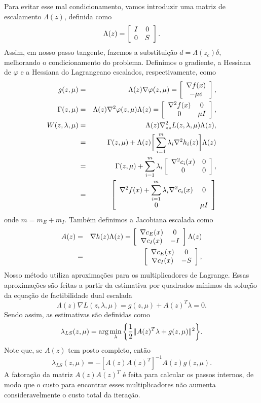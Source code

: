 Para evitar esse mal condicionamento, vamos
introduzir uma matriz de escalamento $\Lambda(z)$, definida como
$$\Lambda(z) = \left[\begin{array}{cc}I & 0 \\ 0 & S\end{array}\right].$$
Assim, em nosso passo tangente, fazemos a substituição $d=\Lambda(z_c)\delta$,
melhorando o condicionamento do problema.
Definimos o gradiente, a Hessiana de $\varphi$ e a 
Hessiana do Lagrangeano escalados, respectivamente, como
\begin{eqnarray}
g(z,\mu) & = & \Lambda(z) \nabla\varphi(z,\mu) = \vetor{\nabla f(x)}{-\mu e},
  \visiblelbl{def:gradiente_escalado} \\ 
\Gamma(z,\mu) & = & \Lambda(z) \nabla^2\varphi(z,\mu)\Lambda(z) = 
  \matriz{\nabla^2 f(x)}{0}{0}{\mu I}, \visiblelbl{def:hess_escalada}\\
W(z,\lambda,\mu) & = & \Lambda(z)\nabla_{zz}^2
  L(z,\lambda,\mu)\Lambda(z),\visiblelbl{def:hess_lagr_escalada} \\
& = & \Gamma(z,\mu) + \Lambda(z)\bigg[\sum_{i = 1}^m \lambda_i \nabla^2
 h_i(z)\bigg]\Lambda(z)\nonumber \\
& = & \Gamma(z,\mu) + \sum_{i = 1}^m\lambda_i\matriz{\nabla^2 c_i(x)}{0}{0}{0},
 \nonumber \\
 & = & \matriz{\nabla^2f(x)+\displaystyle\sum_{i=1}^m\lambda_i\nabla^2
   c_i(x)}{0}{0}{\mu I} \nonumber
\end{eqnarray}
onde $m = m_E+m_I$.
Também definimos a Jacobiana escalada como
\begin{eqnarray}
A(z) & = & \nabla h(z) \Lambda(z) = 
\matriz{\nabla  c_E(x)}{0}{\nabla c_I(x)}{-I}\Lambda(z) \nonumber \\
& = & \matriz{\nabla c_E(x)}{0}{\nabla c_I(x)}{-S},
\visiblelbl{def:jacobiana_escalada}
\end{eqnarray}
Nosso método utiliza aproximações para os multiplicadores de Lagrange.
Essas aproximações são feitas a partir da estimativa por quadrados mínimos da
solução da equação de factibilidade dual escalada
$$\Lambda(z) \nabla L(z,\lambda,\mu) = g(z,\mu) + A(z)^T\lambda = 0.$$
Sendo assim, as estimativas são definidas como
\begin{equation}\visiblelbl{lagr:argmin}
\lambda_{LS}(z,\mu) = \arg\min_{\lambda}\bigg\{\meio\norma{A(z)^T\lambda + g(z,\mu)}^2\bigg\}.
\end{equation}
Note que, se $A(z)$ tem posto completo, ent\~ao
$$\lambda_{LS}(z,\mu) = -[A(z)A(z)^T]^{-1}A(z)g(z,\mu).$$
A fatoração da matriz $A(z)A(z)^T$ é feita para calcular os passos internos, de
modo que o custo para encontrar esses multiplicadores não aumenta
consideravelmente o custo total da iteração.

